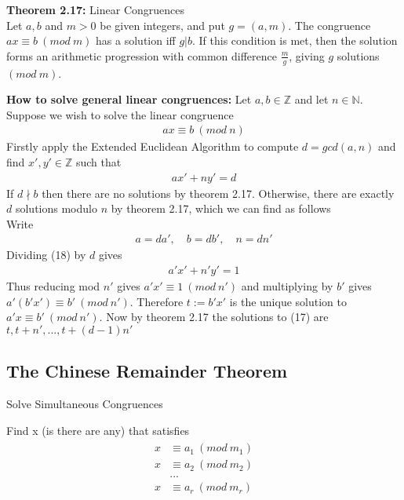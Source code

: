 \documentclass[a4paper]{article}
\begin{document}
\textbf{Theorem 2.17:} Linear Congruences\\
Let $a,b$ and $m>0$ be given integers, and put $g=(a,m)$. The congruence $ax\equiv b\ (mod\ m)$ has a solution iff $g|b$. If this condition is met, then the solution forms an arithmetic progression with common difference $\frac{m}{g}$, giving $g$ solutions $(mod\ m)$.

\textbf{How to solve general linear congruences:}
Let $a,b\in\mathbb{Z}$ and let $n\in\mathbb{N}$. Suppose we wish to solve the linear congruence
\begin{align}
    ax\equiv b\ (mod\ n)
\end{align}
Firstly apply the Extended Euclidean Algorithm to compute $d=gcd(a,n)$ and find $x',y'\in\mathbb{Z}$ such that
\begin{align}
    ax'+ny'=d
\end{align}
If $d\nmid b$ then there are no solutions by theorem 2.17. Otherwise, there are exactly $d$ solutions modulo $n$ by theorem 2.17, which we can find as follows\\
Write
\begin{align}
    a=da',\quad b=db',\quad n=dn'
\end{align}
Dividing (18) by $d$ gives
\begin{align}
    a'x'+n'y'=1
\end{align}
Thus reducing mod $n'$ gives $a'x'\equiv1\ (mod\ n')$ and multiplying by $b'$ gives $a'(b'x')\equiv b'\ (mod\ n')$. Therefore $t:=b'x'$ is the unique solution to $a'x\equiv b'\ (mod\ n')$. Now by theorem 2.17 the solutions to (17) are $t,t+n',...,t+(d-1)n'$


\subsection{The Chinese Remainder Theorem}
Solve Simultaneous Congruences

Find x (is there are any) that satisfies
\begin{align}
    \begin{split}
        x & \equiv a_1\ (mod\ m_1)\\
        x & \equiv a_2\ (mod\ m_2)\\
          & ...\\
        x & \equiv a_r\ (mod\ m_r)\\
    \end{split}
\end{align}
\end{document}

